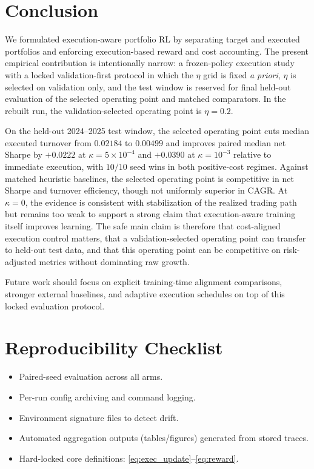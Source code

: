 \documentclass[10pt,twocolumn]{article}
\begin{document}
\section{Conclusion}
We formulated execution-aware portfolio RL by separating target and executed portfolios and enforcing execution-based reward and cost accounting. The present empirical contribution is intentionally narrow: a frozen-policy execution study with a locked validation-first protocol in which the $\eta$ grid is fixed \emph{a priori}, $\eta$ is selected on validation only, and the test window is reserved for final held-out evaluation of the selected operating point and matched comparators. In the rebuilt run, the validation-selected operating point is $\eta=0.2$.

On the held-out 2024--2025 test window, the selected operating point cuts median executed turnover from $0.02184$ to $0.00499$ and improves paired median net Sharpe by $+0.0222$ at $\kappa=5\times10^{-4}$ and $+0.0390$ at $\kappa=10^{-3}$ relative to immediate execution, with $10/10$ seed wins in both positive-cost regimes. Against matched heuristic baselines, the selected operating point is competitive in net Sharpe and turnover efficiency, though not uniformly superior in CAGR. At $\kappa=0$, the evidence is consistent with stabilization of the realized trading path but remains too weak to support a strong claim that execution-aware training itself improves learning. The safe main claim is therefore that cost-aligned execution control matters, that a validation-selected operating point can transfer to held-out test data, and that this operating point can be competitive on risk-adjusted metrics without dominating raw growth.

Future work should focus on explicit training-time alignment comparisons, stronger external baselines, and adaptive execution schedules on top of this locked evaluation protocol.

\appendix
\section{Reproducibility Checklist}
\label{app:repro}
\begin{itemize}[leftmargin=*,itemsep=1pt]
\item Paired-seed evaluation across all arms.
\item Per-run config archiving and command logging.
\item Environment signature files to detect drift.
\item Automated aggregation outputs (tables/figures) generated from stored traces.
\item Hard-locked core definitions: \eqref{eq:exec_update}--\eqref{eq:reward}.
\end{itemize}
\end{document}
